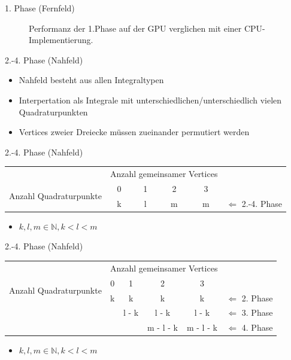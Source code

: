 \documentclass[10pt]{beamer}
\begin{document}
\begin{frame}{1. Phase (Fernfeld)}
  \begin{figure}
    \centering
    \caption{Performanz der 1.Phase auf der GPU verglichen mit einer
             CPU-Implementierung.}
  \end{figure}
\end{frame}

\begin{frame}{2.-4. Phase (Nahfeld)}
  \begin{itemize}
    \item Nahfeld besteht aus allen Integraltypen
    \item Interpertation als Integrale mit unterschiedlichen/unterschiedlich
          vielen Quadraturpunkten
    \item Vertices zweier Dreiecke müssen zueinander permutiert werden\footnotemark[1]
  \end{itemize}
  \footnotesize
  \normalsize
\end{frame}

\begin{frame}{2.-4. Phase (Nahfeld)}
  \begin{tabular}{cccccc} \cmidrule[\heavyrulewidth]{1-5}
     & \multicolumn{4}{c}{Anzahl gemeinsamer Vertices} & \\ \cmidrule{2-5}
    \multirow{2}{*}{Anzahl Quadraturpunkte} & 0 & 1 & 2 & 3 & \\ \cmidrule{2-5}
     & k & l & m & m & \(\Leftarrow\) 2.-4. Phase\\
    \cmidrule[\heavyrulewidth]{1-5}
  \end{tabular}
  \begin{itemize}
    \item \(k, l, m \in \mathbb{N}, k < l < m\)
  \end{itemize}
\end{frame}

\begin{frame}{2.-4. Phase (Nahfeld)}
  \begin{tabular}{cccccc} \cmidrule[\heavyrulewidth]{1-5}
     & \multicolumn{4}{c}{Anzahl gemeinsamer Vertices} & \\ \cmidrule{2-5}
    \multirow{2}{*}{Anzahl Quadraturpunkte} & 0 & 1 & 2 & 3 & \\ \cmidrule{2-5}
     & k & k     & k         & k         & \(\Leftarrow\) 2. Phase \\
     &   & l - k & l - k     & l - k     & \(\Leftarrow\) 3. Phase \\
     &   &       & m - l - k & m - l - k & \(\Leftarrow\) 4. Phase \\
    \cmidrule[\heavyrulewidth]{1-5}
  \end{tabular}
  \begin{itemize}
    \item \(k, l, m \in \mathbb{N}, k < l < m\)
  \end{itemize}
\end{frame}
\end{document}
